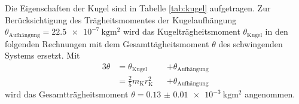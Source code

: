 \begin{figure}[H]
\centering
\begin{minipage}[t]{0.4\textwidth}
\centering


\end{minipage}
\hspace{5pt}
\begin{minipage}[t]{0.4\textwidth}
\centering


\end{minipage}
\end{figure}

Die Eigenschaften der Kugel sind in Tabelle \ref{tab:kugel} aufgetragen.
Zur Berücksichtigung des Trägheitsmomentes der Kugelaufhängung $\theta_\text{Aufhängung}=\SI{22.5e-7}{\kilo\gram\meter\squared}$ \cite{V102} wird das Kugelträgheitsmoment $\theta_\text{Kugel}$ in den folgenden Rechnungen mit dem Gesamttägheitsmoment $\theta$ des schwingenden Systems ersetzt.
Mit 
\begin{alignat}{3}
	\theta	&=\theta_\text{Kugel} &&+\theta_\text{Aufhängung}\label{eq:gesamttraegheit}\\ 
		&=\frac{2}{5} m_\text{K} r_\text{K}^2 &&+\theta_\text{Aufhängung} %
\end{alignat}
wird das Gesamtträgheitsmoment $\theta=\SI{0.13(1)e-3}{\kilo\gram\meter\squared}$ angenommen.
